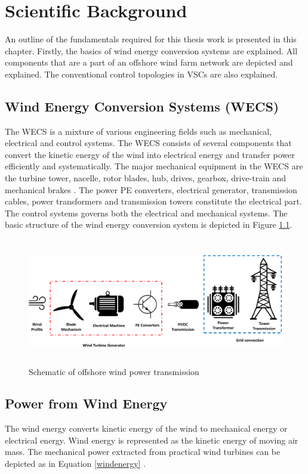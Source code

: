 \chapter{Scientific Background}\label{2}
An outline of the fundamentals required for this thesis work is presented in this chapter. Firstly, the basics of wind energy conversion systems are explained. All components that are a part of an offshore wind farm network are depicted and explained. The conventional control topologies in \gls{VSC}s are also explained.

\section{Wind Energy Conversion Systems (WECS)}\label{WECS_theory}
The \gls{WECS} is a mixture of various engineering fields such as mechanical, electrical and control systems. The \gls{WECS} consists of several components that convert the kinetic energy of the wind into electrical energy and transfer power efficiently and systematically. The major mechanical equipment in the \gls{WECS} are the turbine tower, nacelle, rotor blades, hub, drives, gearbox, drive-train and mechanical brakes \cite{manwell2010wind}. The power \gls{PE} converters, electrical generator, transmission cables, power transformers and transmission towers constitute the electrical part. The control systems \cite{yaramasu_high-power_2015} governs both the electrical and mechanical systems.
The basic structure of the wind energy conversion system is depicted in Figure \ref{fig:WECS}.   

\begin{figure}[H]
\centering
    \includegraphics[height = 5.5cm,width = 15.5cm]{Diagrams/Chapter_2/WECS.pdf}
    \caption{Schematic of offshore wind power transmission}
    \label{fig:WECS}
\end{figure}

\section{Power from Wind Energy} 
The wind energy converts kinetic energy of the wind to mechanical energy or electrical energy. Wind energy is represented as the kinetic energy of moving air mass. The mechanical power extracted from practical wind turbines can be depicted as in Equation \ref{windenergy} \cite{ali_wind_2012}.


